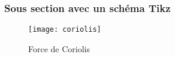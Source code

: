 \blindtext[2]

\subsubsection{Sous section avec un schéma Tikz}

%     

\begin{figure}[ht]
    \centering
    \texttt{[image: coriolis]}
    \caption{Force de Coriolis}%
    \label{fig:coriolisbis}
\end{figure}

